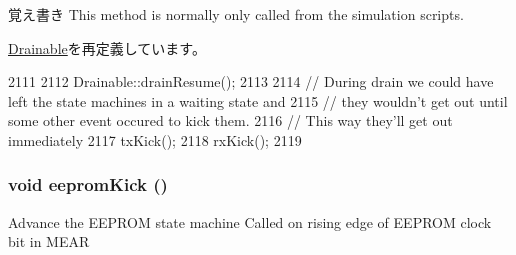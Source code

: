 \begin{DoxyNote}{覚え書き}
This method is normally only called from the simulation scripts. 
\end{DoxyNote}


\hyperlink{classDrainable_a8f020d3237536fe007fc488c4125c5d8}{Drainable}を再定義しています。


\begin{DoxyCode}
2111 {
2112     Drainable::drainResume();
2113 
2114     // During drain we could have left the state machines in a waiting state and
2115     // they wouldn't get out until some other event occured to kick them.
2116     // This way they'll get out immediately
2117     txKick();
2118     rxKick();
2119 }
\end{DoxyCode}
\hypertarget{classNSGigE_afa6a9bad7d4134cee335eae4b127d3b0}{
\subsubsection[{eepromKick}]{\setlength{\rightskip}{0pt plus 5cm}void eepromKick ()}}
\label{classNSGigE_afa6a9bad7d4134cee335eae4b127d3b0}
Advance the EEPROM state machine Called on rising edge of EEPROM clock bit in MEAR 


